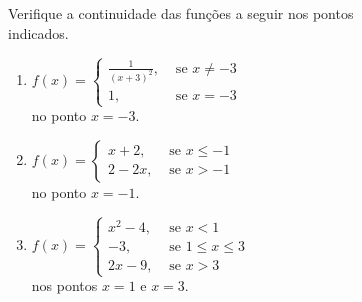\begin{frame}
  \begin{columns}[onlytextwidth]
    \begin{column}{0.4\textwidth}\vspace{-0.5cm}
      \begin{example}
        Verifique a continuidade das funções a seguir nos pontos indicados.
      \end{example}
      \begin{enumerate}
        \item<only@1-2> $f(x) = \begin{cases}
          \frac{1}{(x+3)^{2}},&\mbox{ se }x\not=-3 \\ 1,&\mbox{ se }x=-3
        \end{cases}$ \\no ponto $x=-3$.
        \item<only@3-4> $f(x) = \begin{cases}
          x+2,&\mbox{ se }x\leq -1 \\ 2-2x,&\mbox{ se }x > -1
        \end{cases}$\\ no ponto $x=-1$.
        \item<only@5-6> $f(x) = \begin{cases}
          x^{2}-4,&\mbox{ se }x < 1 \\ -3,&\mbox{ se }1 \leq x \leq 3 \\ 2x-9,&\mbox{ se }x > 3
        \end{cases}$\\ nos pontos $x=1$ e $x=3$.
      \end{enumerate}
    \end{column}
    \begin{column}{0.59\textwidth}
      \begin{figure}
      \end{figure}
    \end{column}
  \end{columns}
\end{frame}

